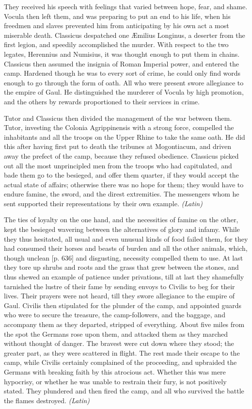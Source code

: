 
They received his speech with feelings that varied between hope, fear, and shame. Vocula then left them, and was preparing to put an end to his life, when his freedmen and slaves prevented him from anticipating by his own act a most miserable death. Classicus despatched one Æmilius Longinus, a deserter from the first legion, and speedily accomplished the murder. With respect to the two legates, Herennius and Numisius, it was thought enough to put them in chains. Classicus then assumed the insignia of Roman Imperial power, and entered the camp. Hardened though he was to every sort of crime, he could only find words enough to go through the form of oath. All who were present swore allegiance to the empire of Gaul. He distinguished the murderer of Vocula by high promotion, and the others by rewards proportioned to their services in crime.

Tutor and Classicus then divided the management of the war between them. Tutor, investing the Colonia Agrippinensis with a strong force, compelled the inhabitants and all the troops on the Upper Rhine to take the same oath. He did this after having first put to death the tribunes at Mogontiacum, and driven away the prefect of the camp, because they refused obedience. Classicus picked out all the most unprincipled men from the troops who had capitulated, and bade them go to the besieged, and offer them quarter, if they would accept the actual state of affairs; otherwise there was no hope for them; they would have to endure famine, the sword, and the direst extremities. The messengers whom he sent supported their representations by their own example. \emph{(Latin)}


The ties of loyalty on the one hand, and the necessities of famine on the other, kept the besieged wavering between the alternatives of glory and infamy. While they thus hesitated, all usual and even unusual kinds of food failed them, for they had consumed their horses and beasts of burden and all the other animals, which, though unclean [p. 636] and disgusting, necessity compelled them to use. At last they tore up shrubs and roots and the grass that grew between the stones, and thus shewed an example of patience under privations, till at last they shamefully tarnished the lustre of their fame by sending envoys to Civilis to beg for their lives. Their prayers were not heard, till they swore allegiance to the empire of Gaul. Civilis then stipulated for the plunder of the camp, and appointed guards who were to secure the treasure, the camp-followers, and the baggage, and accompany them as they departed, stripped of everything. About five miles from the spot the Germans rose upon them, and attacked them as they marched without thought of danger. The bravest were cut down where they stood; the greater part, as they were scattered in flight. The rest made their escape to the camp, while Civilis certainly complained of the proceeding, and upbraided the Germans with breaking faith by this atrocious act. Whether this was mere hypocrisy, or whether he was unable to restrain their fury, is not positively stated. They plundered and then fired the camp, and all who survived the battle the flames destroyed. \emph{(Latin)}


